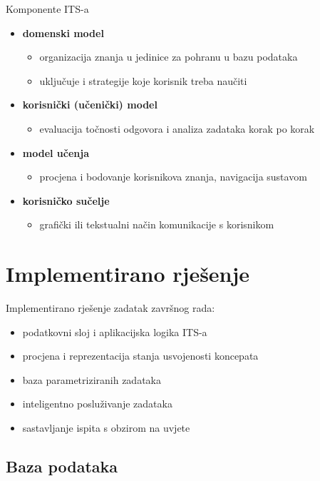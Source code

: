 \documentclass[times, utf8, numeric]{beamer}
\begin{document}
\begin{frame}{Komponente ITS-a}
\begin{itemize}
	\item \textbf{domenski model}
	\begin{itemize}
		\item organizacija znanja u jedinice za pohranu u bazu podataka
		\item uključuje i strategije koje korisnik treba naučiti
	\end{itemize}
	\item \textbf{korisnički (učenički) model}
	\begin{itemize}
		\item evaluacija točnosti odgovora i analiza zadataka korak po korak
	\end{itemize}
	\item \textbf{model učenja}
	\begin{itemize}
		\item procjena i bodovanje korisnikova znanja, navigacija sustavom
	\end{itemize}
	\item \textbf{korisničko sučelje}
	\begin{itemize}
		\item grafički ili tekstualni način komunikacije s korisnikom
	\end{itemize}
\end{itemize}
\end{frame}

\section{Implementirano rješenje}
\begin{frame}{Implementirano rješenje}
zadatak završnog rada:
\begin{itemize}
	\item podatkovni sloj i aplikacijska logika ITS-a
	\item procjena i reprezentacija stanja usvojenosti koncepata
	\item baza parametriziranih zadataka
	\item inteligentno posluživanje zadataka
	\item sastavljanje ispita s obzirom na uvjete
\end{itemize}
\end{frame}

\subsection{Baza podataka}
\end{document}
